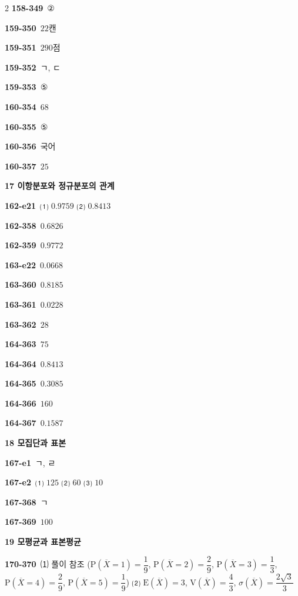 \documentclass[10pt,a4paper]{article}
\begin{document}
\begin{multicols}{2}
\noindent\textbf{158-349}\ ②\par
\noindent\textbf{159-350}\ $22$캔\par
\noindent\textbf{159-351}\ $290$점\par
\noindent\textbf{159-352}\ ㄱ, ㄷ\par
\noindent\textbf{159-353}\ ⑤\par
\noindent\textbf{160-354}\ $68$\par
\noindent\textbf{160-355}\ ⑤\par
\noindent\textbf{160-356}\ 국어\par
\noindent\textbf{160-357}\ $25$\par
\noindent\textbf{17 이항분포와 정규분포의 관계}\par\smallskip
\noindent\textbf{162-e21}\ ⑴ $0.9759$ ⑵ $0.8413$\par
\noindent\textbf{162-358}\ $0.6826$\par
\noindent\textbf{162-359}\ $0.9772$\par
\noindent\textbf{163-e22}\ $0.0668$\par
\noindent\textbf{163-360}\ $0.8185$\par
\noindent\textbf{163-361}\ $0.0228$\par
\noindent\textbf{163-362}\ $28$\par
\noindent\textbf{164-363}\ $75$\par
\noindent\textbf{164-364}\ $0.8413$\par
\noindent\textbf{164-365}\ $0.3085$\par
\noindent\textbf{164-366}\ $160$\par
\noindent\textbf{164-367}\ $0.1587$\par
\noindent\textbf{18 모집단과 표본}\par\smallskip
\noindent\textbf{167-e1}\ ㄱ, ㄹ\par
\noindent\textbf{167-e2}\ ⑴ $125$ ⑵ $60$ ⑶ $10$\par
\noindent\textbf{167-368}\ ㄱ\par
\noindent\textbf{167-369}\ $100$\par
\noindent\textbf{19 모평균과 표본평균}\par\smallskip
\noindent\textbf{170-370}\ ⑴ 풀이 참조 ($\mathrm{P}(\overline{X}=1)=\dfrac{1}{9}$, $\mathrm{P}(\overline{X}=2)=\dfrac{2}{9}$, $\mathrm{P}(\overline{X}=3)=\dfrac{1}{3}$, $\mathrm{P}(\overline{X}=4)=\dfrac{2}{9}$, $\mathrm{P}(\overline{X}=5)=\dfrac{1}{9}$) ⑵ $\mathrm{E}(\overline{X})=3$, $\mathrm{V}(\overline{X})=\dfrac{4}{3}$, $\sigma(\overline{X})=\dfrac{2\sqrt{3}}{3}$\par

\end{multicols}
\end{document}

